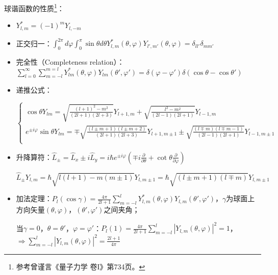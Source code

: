 球谐函数的性质\footnote{参考曾谨言《量子力学 卷I》第734页。}：

\begin{itemize}
    \item $Y_{l,m}^*  = ( - 1)^m Y_{l, - m} $

    \item 正交归一：$\int_0^{2\pi } {d\varphi \int_0^\pi  {\sin \theta d\theta Y_{l,m}^* (\theta ,\varphi )Y_{l',m'} (\theta ,\varphi )} }  = \delta _{ll'} \delta _{mm'} $

    \item 完全性（Completeness relation）：$\sum\limits_{l = 0}^\infty  {\sum\limits_{m =  - l}^{m = l} {Y_{lm}^* (\theta ,\varphi )Y_{lm} (\theta ',\varphi ')} }  = \delta (\varphi  - \varphi ')\delta (\cos \theta  - \cos \theta ')$

    \item 递推公式：

\begin{equation}\label{14-6}
\left\{ \begin{array}{l}
 \cos \theta Y_{lm}  = \sqrt {\frac{{(l + 1)^2  - m^2 }}{{(2l + 1)(2l + 3)}}} Y_{l + 1,m}  + \sqrt {\frac{{l^2  - m^2 }}{{(2l - 1)(2l + 1)}}} Y_{l - 1,m}  \\
 e^{ \pm i\varphi } \sin \theta Y_{lm}  =  \mp \sqrt {\frac{{(l \pm m + 1)(l \pm m + 2)}}{{(2l + 1)(2l + 3)}}} Y_{l + 1,m \pm 1}  \pm \sqrt {\frac{{(l \mp m)(l \mp m - 1)}}{{(2l - 1)(2l + 1)}}} Y_{l - 1,m \pm 1}  \\
 \end{array} \right.
\end{equation}


    \item 升降算符：$\widehat L_ \pm   = \widehat L_x  \pm i\widehat L_y  = i\hbar e^{ \pm i\varphi } \left( { \mp i\frac{\partial }{{\partial \theta }} + \cot \theta \frac{\partial }{{\partial \varphi }}} \right)$

\begin{equation}\label{14-7}
\widehat L_ \pm  Y_{l,m}  = \hbar \sqrt {l(l + 1) - m(m \pm 1)} Y_{l,m \pm 1}  = \hbar \sqrt {(l \pm m + 1)(l \mp m)} Y_{l,m \pm 1}
\end{equation}

    \item 加法定理：$P_l (\cos \gamma ) = \frac{{4\pi }}{{2l + 1}}\sum\limits_{m =  - l}^l {Y_{l,m}^* (\theta ,\varphi )Y_{l,m} (\theta ',\varphi ')} $，$\gamma$为球面上方向矢量$\left( {\theta ,\varphi } \right)$，$\left( {\theta ',\varphi '} \right)$之间夹角；

当$\gamma  = 0$，$\theta  = \theta '$，$\varphi  = \varphi '$：$P_l (1) = \frac{{4\pi }}{{2l + 1}}\sum\limits_{m =  - l}^l {\left| {Y_{l,m} (\theta ,\varphi )} \right|^2 }  = 1$，$ \Rightarrow \sum\limits_{m =  - l}^l {\left| {Y_{l,m} (\theta ,\varphi )} \right|^2 }  = \frac{{2l + 1}}{{4\pi }}$

\end{itemize}

